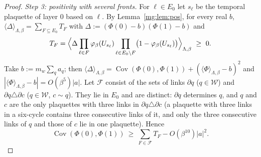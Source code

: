 \documentclass[11pt,a4paper]{article}
\theoremstyle{definition}
\theoremstyle{remark}
\DeclareMathOperator{\Cov}{Cov}
\begin{document}
\begin{proof}
\emph{Step 3: positivity with several fronts.} For $\ell\in E_0$ let $s_\ell$ be the temporal plaquette of layer $0$ based on $\ell$. By
Lemma~\ref{mg:lem:pos}, for every real $b$, $\langle\Delta\rangle_{\Lambda,\beta}=\sum_{F\subseteq E_0}T_F$ with $\Delta:=(\Phi(0)-b)(\Phi(1)-b)$ and
\[
T_F=\Bigl\langle\Delta\prod_{\ell\in F}\varphi_\beta(U_{s_\ell})\prod_{\ell\in E_0\setminus F}\bigl(1-\varphi_\beta(U_{s_\ell})\bigr)\Bigr\rangle_{\Lambda,\beta}\ \ge\ 0 .
\]
Take $b:=m_w\sum_qa_q$; then $\langle\Delta\rangle_{\Lambda,\beta}=\Cov(\Phi(0),\Phi(1))+(\langle\Phi\rangle_{\Lambda,\beta}-b)^2$ and
$|\langle\Phi\rangle_{\Lambda,\beta}-b|=O(\beta^5)|a|$. Let $\mathcal F$ consist
of the sets of links $\partial q$ ($q\in\mathcal W$) and $\partial q\triangle\partial c$ ($q\in\mathcal W$, $c\sim q$). They lie in $E_0$ and are distinct:
$\partial q$ determines $q$, and $q$ and $c$ are the only plaquettes with three links in $\partial q\triangle\partial c$ (a plaquette with three links in a six-cycle
contains three consecutive links of it, and only the three consecutive links of $q$ and those of $c$ lie in one plaquette). Hence
\[
\Cov(\Phi(0),\Phi(1))\ \ge\ \sum_{F\in\mathcal F}T_F-O(\beta^{10})|a|^2 .
\]


\end{proof}
\end{document}
